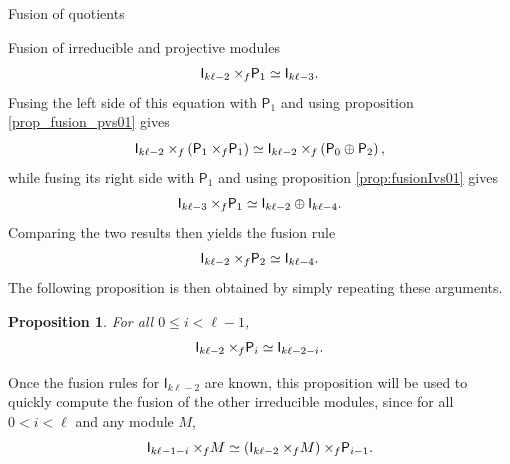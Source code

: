 \documentclass[reqno]{amsart}
\newtheorem{Prop}[Thm]{Proposition}
\newcommand{\dl}[1]{\mathsf I_{#1}}
\newcommand{\dP}[1]{\mathsf P_{#1}}
\newcommand{\xf}{\times\hspace{-0.27em}_f}
\newcommand{\lc}{\ell}
\begin{document}
\begin{section}{Fusion of quotients}
\begin{subsection}{Fusion of irreducible and projective modules}
\begin{equation*}
	\dl{k \lc -2} \xf \dP{1} \simeq \dl{k \lc -3}.
\end{equation*}
Fusing the left side of this equation with $\dP{1}$ and using proposition \ref{prop_fusion_pvs01} gives
\begin{equation}
	\dl{k \lc -2} \xf \left(\dP{1} \xf \dP{1} \right) \simeq \dl{k \lc -2} \xf \left(\dP{0} \oplus \dP{2}\right),
\end{equation}
while fusing its right side with $\dP{1}$ and using proposition \ref{prop:fusionIvs01} gives
\begin{equation}
\dl{k \lc -3} \xf \dP{1} \simeq \dl{k\lc -2} \oplus \dl{k \lc -4}.
\end{equation}
Comparing the two results then yields the fusion rule
\begin{equation*}
	\dl{k \lc -2} \xf \dP{2} \simeq \dl{k \lc -4}.
\end{equation*}
The following proposition is then obtained by simply repeating these arguments.
\begin{Prop}\label{prop:fusionIvssmallP}
For all $0\leq i<\lc-1$,
\begin{equation}
\dl{k \lc -2} \xf \dP{i} \simeq \dl{k \lc -2-i}.
\end{equation}
\end{Prop}
Once the fusion rules for $\dl{k\lc -2}$ are known, this proposition will be used to quickly compute the fusion of the other irreducible modules, since for all $0 < i < \lc$ and any module $M$,
\begin{equation*}
	\dl{k \lc -1 -i} \xf M \simeq \left(\dl{k \lc -2} \xf M \right) \xf \dP{i-1}.
\end{equation*}


\end{subsection}
\end{section}
\end{document}

